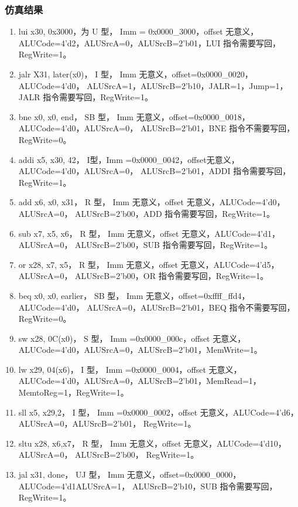 \documentclass{../source/Experiment}
\begin{document}
            \subsubsection{仿真结果}
                \begin{enumerate}
                    \item lui x30, 0x3000，为 U 型， Imm = 0x0000\_3000，offset 无意义，ALUCode=4’d2，ALUSrcA=0，ALUSrcB=2’b01，LUI 指令需要写回，RegWrite=1。
                    \item jalr X31, later(x0)， I 型， Imm 无意义，offset=0x0000\_0020，ALUCode=4’d0，
                    ALUSrcA=1，ALUSrcB=2’b10，JALR=1，Jump=1，JALR 指令需要写回，RegWrite=1。
                    \item bne x0, x0, end， SB 型， Imm 无意义，offset=0x0000\_0018，ALUCode=4’d0，ALUSrcA=0，
                    ALUSrcB=2’b01，BNE 指令不需要写回，RegWrite=0。
                    \item addi x5, x30, 42， I型，Imm =0x0000\_0042，offset无意义，ALUCode=4’d0，ALUSrcA=0，
                    ALUSrcB=2’b01，ADDI 指令需要写回，RegWrite=1。
                    \item add x6, x0, x31， R 型， Imm 无意义，offset 无意义，ALUCode=4’d0，ALUSrcA=0，
                    ALUSrcB=2’b00，ADD 指令需要写回，RegWrite=1。
                    \item sub x7, x5, x6， R 型， Imm 无意义，offset 无意义，ALUCode=4’d1，ALUSrcA=0，
                    ALUSrcB=2’b00，SUB 指令需要写回，RegWrite=1。
                    \item or x28, x7, x5， R 型， Imm 无意义，offset 无意义，ALUCode=4’d5，ALUSrcA=0，
                    ALUSrcB=2’b00，OR 指令需要写回，RegWrite=1。
                    \item beq x0, x0, earlier， SB 型， Imm 无意义，offset=0xffff\_ffd4，ALUCode=4’d0，
                    ALUSrcA=0，ALUSrcB=2’b01，BEQ 指令不需要写回，RegWrite=0。
                    \item sw x28, 0C(x0)， S 型， Imm =0x0000\_000c，offset 无意义，ALUCode=4’d0，ALUSrcA=0，ALUSrcB=2’b01，MemWrite=1。
                    \item lw x29, 04(x6)， I 型， Imm =0x0000\_0004，offset 无意义，ALUCode=4’d0，ALUSrcA=0，ALUSrcB=2’b01，MemRead=1，MemtoReg=1，RegWrite=1。
                    \item sll x5, x29,2， I 型， Imm =0x0000\_0002，offset 无意义，ALUCode=4’d6，ALUSrcA=0，ALUSrcB=2’b01， RegWrite=1。
                    \item sltu x28, x6,x7， R 型， Imm 无意义，offset 无意义，ALUCode=4’d10，ALUSrcA=0，
                    ALUSrcB=2’b00， RegWrite=1。
                    \item jal x31, done， UJ 型， Imm 无意义，offset=0x0000\_0000，ALUCode=4’d1ALUSrcA=1，
                    ALUSrcB=2’b10，SUB 指令需要写回，RegWrite=1。
                \end{enumerate}
\end{document}
